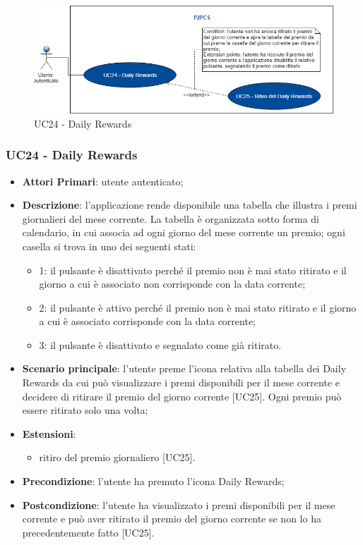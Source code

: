 \begin{figure}[h]
	\includegraphics[width=13.2cm]{res/images/UC24Daily.png}
	\centering
	\caption{UC24 - Daily Rewards}
\end{figure}
\subsubsection{UC24 - Daily Rewards}
\begin{itemize}
	\item \textbf{Attori Primari}: utente autenticato;
	\item \textbf{Descrizione}: l'applicazione rende disponibile una tabella che illustra i premi giornalieri del mese corrente. La tabella è organizzata sotto forma di calendario, in cui associa ad ogni giorno del mese corrente un premio;
	ogni casella si trova in uno dei seguenti stati:
	\begin{itemize}
		\item 1: il pulsante è disattivato perché il premio non è mai stato ritirato e il giorno a cui è associato non corrisponde con la data corrente;
		\item 2: il pulsante è attivo perché il premio non è mai stato ritirato e il giorno a cui è associato corrisponde con la data corrente;
		\item 3: il pulsante è disattivato e segnalato come già ritirato. 
	\end{itemize} 
	\item \textbf{Scenario principale}: l'utente preme l'icona relativa alla tabella dei Daily Rewards da cui può visualizzare i premi disponibili per il mese corrente e decidere di ritirare il premio del giorno corrente [UC25].
	Ogni premio può essere ritirato solo una volta;
	\item \textbf{Estensioni}: 
		\begin{itemize}
			\item ritiro del premio giornaliero [UC25].
		\end{itemize}
	\item \textbf{Precondizione}: l'utente ha premuto l'icona Daily Rewards;
	\item \textbf{Postcondizione}: l'utente ha visualizzato i premi disponibili per il mese corrente e può aver ritirato il premio del giorno corrente se non lo ha precedentemente fatto [UC25]. 
\end{itemize} 

